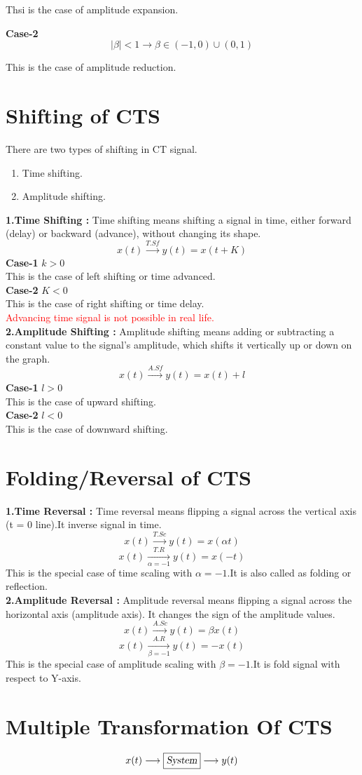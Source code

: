 \documentclass[a5paper,10pt]{report}
\begin{document}

Thsi is the case of amplitude expansion.\par
\textbf{Case-2}
\[
|\beta|<1 \longrightarrow \beta \in (-1,0)\cup (0,1)
\]


This is the case of amplitude reduction.
\section{Shifting of CTS}
There are two types of shifting in CT signal.
\begin{enumerate}
    \item Time shifting.
    \item Amplitude shifting.
\end{enumerate}
\textbf{1.Time Shifting : }Time shifting means shifting a signal in time, either forward (delay) or backward (advance), without changing its shape.
\[
x(t)\xrightarrow{T.Sf} y(t)=x(t+K)
\]
\textbf{Case-1} $k>0$\\
This is the case of left shifting or time advanced.\\
\textbf{Case-2 } $K<0$\\
This is the case of right shifting or time delay.\\
\textcolor{red}{Advancing time signal is not possible in real life.}\\
\textbf{2.Amplitude Shifting :} Amplitude shifting means adding or subtracting a constant value to the signal’s amplitude, which shifts it vertically up or down on the graph.\\
\[
x(t)\xrightarrow{A.Sf} y(t)=x(t)+l
\]
\textbf{Case-1} $l>0$\\
This is the case of upward shifting.\\
\textbf{Case-2} $l<0$\\
This is the case of downward shifting.\\
\section{Folding/Reversal of CTS }
\textbf{1.Time Reversal :} Time reversal means flipping a signal across the vertical axis (t = 0 line).It inverse signal in time.\\
\[
x(t)\xrightarrow{T.Sc} y(t)=x(\alpha t)
\]
\[
x(t)\xrightarrow[\alpha=-1]{T.R} y(t)=x(-t)
\]
This is the special case of time scaling with $\alpha=-1$.It is also called as folding or reflection.\\
\textbf{2.Amplitude Reversal :} Amplitude reversal means flipping a signal across the horizontal axis (amplitude axis).
It changes the sign of the amplitude values.
\[
x(t)\xrightarrow{A.Sc} y(t)=\beta x(t)
\]
\[
x(t)\xrightarrow[\beta=-1]{A.R} y(t)= -x(t)
\]
This is the special case of amplitude scaling with $\beta=-1$.It is fold signal with respect to Y-axis.

\section{Multiple Transformation Of CTS}
\[
    x(t)\longrightarrow \boxed{\textsl{System}}\longrightarrow y(t)
\]
\begin{tcolorbox}[breakable, title=Problem 1. Draw the signal $y(t)=3x(2t+3)$]
    
\end{tcolorbox}
\end{document}
